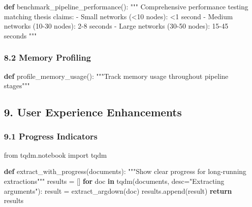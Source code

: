 \documentclass[
  11pt,
  letterpaper,
]{book}
\newenvironment{Shaded}{\begin{snugshade}}{\end{snugshade}}
\newcommand{\CommentTok}[1]{\textcolor[rgb]{0.37,0.37,0.37}{#1}}
\newcommand{\ControlFlowTok}[1]{\textcolor[rgb]{0.00,0.23,0.31}{\textbf{#1}}}
\newcommand{\ImportTok}[1]{\textcolor[rgb]{0.00,0.46,0.62}{#1}}
\newcommand{\KeywordTok}[1]{\textcolor[rgb]{0.00,0.23,0.31}{\textbf{#1}}}
\newcommand{\NormalTok}[1]{\textcolor[rgb]{0.00,0.23,0.31}{#1}}
\newcommand{\OperatorTok}[1]{\textcolor[rgb]{0.37,0.37,0.37}{#1}}
\newcommand{\StringTok}[1]{\textcolor[rgb]{0.13,0.47,0.30}{#1}}
\begin{document}
\begin{Shaded}
\begin{Highlighting}[]
\KeywordTok{def}\NormalTok{ benchmark\_pipeline\_performance():}
    \CommentTok{"""}
\CommentTok{    Comprehensive performance testing matching thesis claims:}
\CommentTok{    {-} Small networks (\textless{}10 nodes): \textless{}1 second}
\CommentTok{    {-} Medium networks (10{-}30 nodes): 2{-}8 seconds  }
\CommentTok{    {-} Large networks (30{-}50 nodes): 15{-}45 seconds}
\CommentTok{    """}
\end{Highlighting}
\end{Shaded}

\subsubsection{8.2 Memory Profiling}\label{memory-profiling}

\begin{Shaded}
\begin{Highlighting}[]
\KeywordTok{def}\NormalTok{ profile\_memory\_usage():}
    \CommentTok{"""Track memory usage throughout pipeline stages"""}
\end{Highlighting}
\end{Shaded}

\subsection{9. User Experience
Enhancements}\label{user-experience-enhancements}

\subsubsection{9.1 Progress Indicators}\label{progress-indicators}

\begin{Shaded}
\begin{Highlighting}[]
\ImportTok{from}\NormalTok{ tqdm.notebook }\ImportTok{import}\NormalTok{ tqdm}

\KeywordTok{def}\NormalTok{ extract\_with\_progress(documents):}
    \CommentTok{"""Show clear progress for long{-}running extractions"""}
\NormalTok{    results }\OperatorTok{=}\NormalTok{ []}
    \ControlFlowTok{for}\NormalTok{ doc }\KeywordTok{in}\NormalTok{ tqdm(documents, desc}\OperatorTok{=}\StringTok{"Extracting arguments"}\NormalTok{):}
\NormalTok{        result }\OperatorTok{=}\NormalTok{ extract\_argdown(doc)}
\NormalTok{        results.append(result)}
    \ControlFlowTok{return}\NormalTok{ results}
\end{Highlighting}
\end{Shaded}
\end{document}
